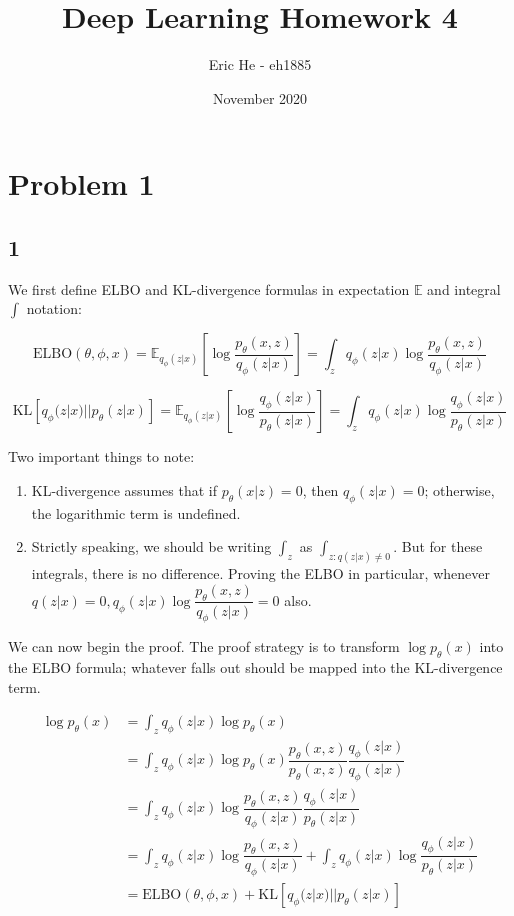 \documentclass{article}
\title{Deep Learning Homework 4}
\author{Eric He - eh1885 }
\date{November 2020}
\begin{document}
\maketitle

\section{Problem 1}
\subsection{1}
We first define ELBO and KL-divergence formulas in expectation $\mathbb{E}$ and integral $\int$ notation:

$$
\text{ELBO}(\theta, \phi, x) 
= \mathbb{E}_{q_\phi(z|x)}[\log \dfrac{p_\theta(x,z)}{q_\phi(z|x)}]
= \int_{z} q_\phi(z|x) \log \dfrac{p_\theta(x,z)}{q_\phi(z|x)}
$$

$$
\text{KL}[q_\phi(z|x) || p_\theta(z|x)]
= \mathbb{E}_{q_\phi(z|x)}[\log \dfrac{q_\phi(z|x)}{p_\theta(z|x)}] 
= \int_{z} q_\phi(z|x) \log \dfrac{q_\phi(z|x)}{p_\theta(z|x)}
$$

Two important things to note: 

\begin{enumerate}
    \item KL-divergence assumes that if $p_\theta(x|z) = 0$, then $q_\phi(z|x) = 0$; otherwise, the logarithmic term is undefined.
    \item Strictly speaking, we should be writing $\int_{z}$ as $\int_{z:q(z|x) \neq 0}$. But for these integrals, there is no difference. Proving the ELBO in particular, whenever $q(z|x) = 0, q_\phi(z|x) \log \dfrac{p_\theta(x,z)}{q_\phi(z|x)} = 0$ also.
\end{enumerate}

We can now begin the proof. The proof strategy is to transform $\log p_\theta (x)$ into the ELBO formula; whatever falls out should be mapped into the KL-divergence term.

\begin{align}
    \log p_\theta (x) &= \int_{z} q_\phi (z|x) \log p_\theta(x) \\
    &= \int_{z} q_\phi (z|x) \log p_\theta(x) \dfrac{p_\theta(x,z)}{p_\theta(x,z)} \dfrac{q_\phi(z|x)}{q_\phi(z|x)} \\
    &= \int_{z} q_\phi (z|x) \log \dfrac{p_\theta(x,z)}{q_\phi(z|x)} \dfrac{q_\phi(z|x)}{p_\theta(z|x)} \\
    &= \int_{z} q_\phi (z|x) \log \dfrac{p_\theta(x,z)}{q_\phi(z|x)} + \int_{z} q_\phi (z|x) \log \dfrac{q_\phi(z|x)}{p_\theta(z|x)} \\ 
    &= \text{ELBO}(\theta, \phi, x) + \text{KL}[q_\phi(z|x) || p_\theta(z|x)]
\end{align}
\end{document}
